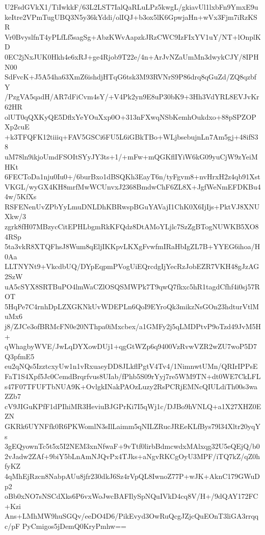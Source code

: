 U2FsdGVkX1/TiIwkkF/63L2LST7IalQaRLuLPz5kwgL/gkiavUl1lxbFn9YmxE9u
keItre2VPmTugUBQ3N5y36kYddi/olIQJ+b3ox5lK6GpwjaHn+wVx3Fjm7iRzKSR
Vr0BvyslfnT4yPLfLf5sagSg+AbzKWvAapzkJRzCWC9IzFIxYV1uY/NT+lOnplKD
0EC2jNxJUK0Hkh4e6xRJ+ge4Rjob9T22e/4n+ArJvNZaUmMn3dwykCJY/8IPHN00
SdFvcK+J5A54ha63XmZ6ishdjHTqG6tsk3M93RVNrS9P86drq8qGuZd/ZQ8qzbfY
/PzgVA5qadH/AR7dFiCvm4sY/+V4Pk2yn9E8uP30bK9+3Hh3VdYRL8EVJvKr62HR
olUT0qQXKyQE5DflxYeYOuXxp0O+313nFXwqNSbKemhOukdxo+88pSPZOPXp2cuE
+k3TFQFK12tiiiq+FAV5GSCi6FU5L6iGBkTBo+WLjbsebujnLn7Am5gj+48ifS38
uM78ln9ikjoUmdFSOItSYyJY3ts+1/+mFw+mQGKflIYiW6kG09yuCjW9zYeiMHKt
6FECToDa1nju0Iu0+/6burBxo1dBSQKh3EayT6n/tyFgvm8+nvHrxH2z4qb91Xst
VKGL/wyGX4KH8mrfMwWCUnvxJ2368BmdwChF6ZL8X+JgfWeNmEFDKBu44w/5KfXs
RSFENenUvZPbYyLmuDNLDhKBRwspBGuYAVajI1ChK0X6IjIjs+PktVJ8XNUXkw/3
zgrk8fH07MBzycCitEPHLbgmRkKFQdz8DtAMoYLjlc7SzZgBTogNUWKB5XO84RSp
5ta3vkR8XTQFhsJ8Wum8qEljIKKpvLKXgFvwfmIRaHbIgZL7B+YYEG6ihoa/H0Aa
LLTNYNt9+VkcdbUQ/DYpEqpmPVogUiEQrcdgIjYecRzJobEZR7VKH48gJzAG2SzW
uA5cSYX8SRTBuPO4lmWaCZlOSQSMWPk7T9qwQ7fkxc5hR1tagdCfhf4i0sj57ROT
5HqPe7C4rnhDpLZXGKNkUvWDEPLn6QoI9EYroQk3mikzNsGOn23hdturVtlMuMx6
j8/ZJCe3ofBRMcFN0e20NThpa0iMxcbex/a1GMFy2j5qLMDPtvP9oTzd49JvM5H+
qWhagbyWVE/JwLqDYXowDUj1+qgGtWZp6q9400VzRvwVZR2wZU7woP5D7Q3pfmE5
eu2qNQs5IzztcxyUw1n1vRxuaeyDD8JLkflPgtV4Tv4/1NimnwtUMn/QRIrIPPsE
FaT1S4Xpf5Jc0CemdBrqrfvus8UIab/fPhb5S09rYyj7re5WM9TN+dt0WE7CkLFL
s47F07TFUFTbNUA9K+OvlgkINakPAOzLuzy2RsPCRjEMNcQIULdiTh00s3waZZb7
cV9JIGuKPfF1dPIhiMR3HeviuBJGPrKi7I5qWj1c/DJBo9hVNLQ+a1X27XHZ0EZN
GKRk6UYNFfk0R6PKWomlN3sIlLaimm5qNILZRucJREeKLfBys79l34Xltr20yqYs
3gEQyownTc5t5x5I2NEM3xnNfwaF+9vTtf0lirbBdmcwdxMAlxqg32U5eQEjQ/b0
2vJadw2ZAf+9biY5bLnAmNJQvPx4TJks+aNgvRKCgOyU3MPF/iTQ7kZ/qZ0hfyKZ
4qMhEjRzcn8NabpAUu8jfr230dkJ6Sz4rVpQL8IwnoZ77P+wJK+AknC179GWuDp2
oBb0xNO7sNSCdXks6P6vxWoJwcBAFIlySpNQuIVkD4cq8V/H+/9dQAY172FC+Kzi
Ans+LMhMW9huSGQv/eeDO4D6/PikEvyd3OwRuQcgJZjcQuEOnT3liGA3rrqqc/pF
PyCmigos5jDemQ0KryPmhw==
